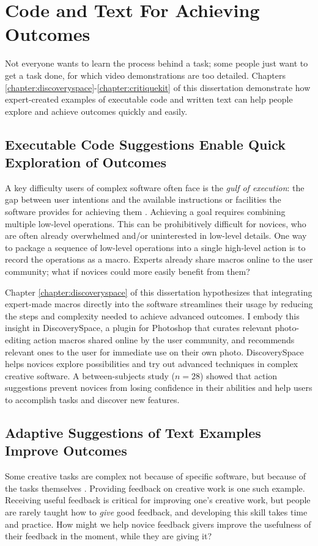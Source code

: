 \section{Code and Text For Achieving Outcomes}
Not everyone wants to learn the process behind a task; some people just want to get a task done, for which video demonstrations are too detailed. Chapters \ref{chapter:discoveryspace}-\ref{chapter:critiquekit} of this dissertation demonstrate how expert-created examples of executable code and written text can help people explore and achieve outcomes quickly and easily. 

\subsection{Executable Code Suggestions Enable Quick Exploration of Outcomes}
A key difficulty users of complex software often face is the \textit{gulf of execution}: the gap between user intentions and the available instructions or facilities the software provides for achieving them \cite{Hutchins1985}. Achieving a goal requires combining multiple low-level operations. This can be prohibitively difficult for novices, who are often already overwhelmed and/or uninterested in low-level details. One way to package a sequence of low-level operations into a single high-level action is to record the operations as a macro. Experts already share macros online to the user community; what if novices could more easily benefit from them?

Chapter \ref{chapter:discoveryspace} of this dissertation hypothesizes that integrating expert-made macros directly into the software streamlines their usage by reducing the steps and complexity needed to achieve advanced outcomes. I embody this insight in DiscoverySpace, a plugin for Photoshop that curates relevant photo-editing action macros shared online by the user community, and recommends relevant ones to the user for immediate use on their own photo. DiscoverySpace helps novices explore possibilities and try out advanced techniques in complex creative software. A between-subjects study ($n=28$) showed that action suggestions prevent novices from losing confidence in their abilities and help users to accomplish tasks and discover new features.

\subsection{Adaptive Suggestions of Text Examples Improve Outcomes}
Some creative tasks are complex not because of specific software, but because of the tasks themselves \cite{Brooks1987}. Providing feedback on creative work is one such example. Receiving useful feedback is critical for improving one's creative work, but people are rarely taught how to \textit{give} good feedback, and developing this skill takes time and practice. How might we help novice feedback givers improve the usefulness of their feedback in the moment, while they are giving it?

